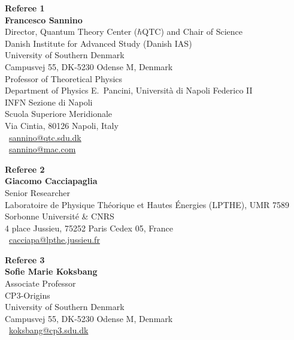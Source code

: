 \documentclass[a4paper,11pt]{letter}
\begin{document}
\noindent
\textbf{Referee 1} \\[0.3em]
\textbf{Francesco Sannino} \\
Director, Quantum Theory Center ($\hbar$QTC) and Chair of Science\\
Danish Institute for Advanced Study (Danish IAS) \\
University of Southern Denmark \\
Campusvej 55, DK-5230 Odense M, Denmark \\[0.4em]
Professor of Theoretical Physics\\
Department of Physics E.\ Pancini, Università di Napoli Federico II \\
INFN Sezione di Napoli \\
Scuola Superiore Meridionale \\
Via Cintia, 80126 Napoli, Italy\\[0.4em]
\faEnvelope\ \href{mailto:sannino@qtc.sdu.dk}{sannino@qtc.sdu.dk} \\
\faEnvelope\ \href{mailto:sannino@mac.com}{sannino@mac.com} \\

\vspace{2em}

\noindent
\textbf{Referee 2} \\[0.3em]
\textbf{ Giacomo Cacciapaglia} \\
Senior Researcher \\
Laboratoire de Physique Théorique et Hautes Énergies (LPTHE), UMR 7589 \\
Sorbonne Université \& CNRS \\
4 place Jussieu, 75252 Paris Cedex 05, France\\[0.4em]
\faEnvelope\ \href{cacciapa@lpthe.jussieu.fr}{cacciapa@lpthe.jussieu.fr} 

\vspace{2em}

\noindent
\textbf{Referee 3} \\[0.3em]
\textbf{Sofie Marie Koksbang} \\
Associate Professor \\
CP3-Origins \\
University of Southern Denmark \\
Campusvej 55, DK-5230 Odense M, Denmark \\[0.4em]
\faEnvelope\ \href{mailto:koksbang@cp3.sdu.dk}{koksbang@cp3.sdu.dk} 
\end{document}
